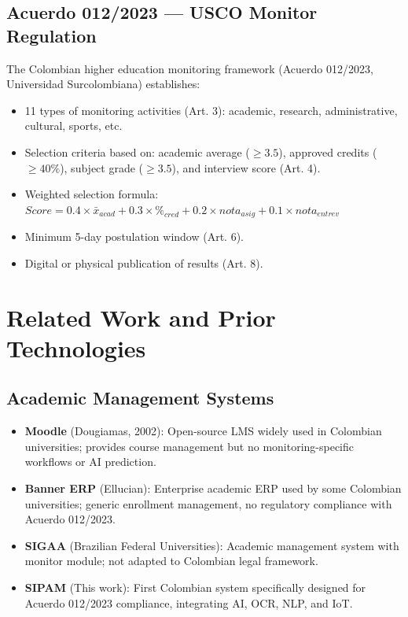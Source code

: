 \documentclass[12pt,a4paper]{report}
\begin{document}
\subsection{Acuerdo 012/2023 — USCO Monitor Regulation}
The Colombian higher education monitoring framework (Acuerdo 012/2023, Universidad Surcolombiana) establishes:
\begin{itemize}
    \item 11 types of monitoring activities (Art. 3): academic, research, administrative, cultural, sports, etc.
    \item Selection criteria based on: academic average ($\geq 3.5$), approved credits ($\geq 40\%$), subject grade ($\geq 3.5$), and interview score (Art. 4).
    \item Weighted selection formula: $Score = 0.4 \times \bar{x}_{acad} + 0.3 \times \%_{cred} + 0.2 \times nota_{asig} + 0.1 \times nota_{entrev}$
    \item Minimum 5-day postulation window (Art. 6).
    \item Digital or physical publication of results (Art. 8).
\end{itemize}

\section{Related Work and Prior Technologies}

\subsection{Academic Management Systems}
\begin{itemize}
    \item \textbf{Moodle} (Dougiamas, 2002): Open-source LMS widely used in Colombian universities; provides course management but no monitoring-specific workflows or AI prediction.
    \item \textbf{Banner ERP} (Ellucian): Enterprise academic ERP used by some Colombian universities; generic enrollment management, no regulatory compliance with Acuerdo 012/2023.
    \item \textbf{SIGAA} (Brazilian Federal Universities): Academic management system with monitor module; not adapted to Colombian legal framework.
    \item \textbf{SIPAM} (This work): First Colombian system specifically designed for Acuerdo 012/2023 compliance, integrating AI, OCR, NLP, and IoT.
\end{itemize}
\end{document}
